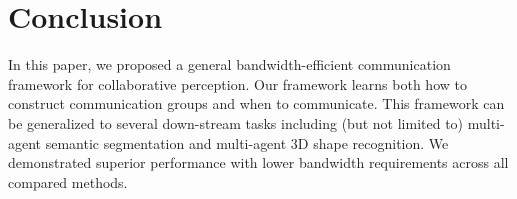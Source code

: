 \section{Conclusion}
In this paper, we proposed a general bandwidth-efficient communication framework for collaborative perception. Our framework learns both how to construct communication groups and when to communicate. This framework can be generalized to several down-stream tasks including (but not limited to) multi-agent semantic segmentation and multi-agent 3D shape recognition. We demonstrated superior performance with lower bandwidth requirements across all compared methods.

